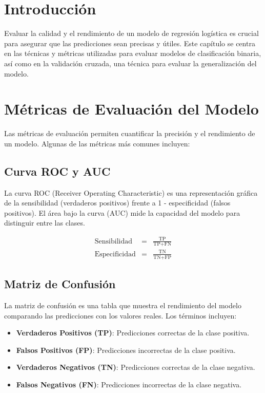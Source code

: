 

\section{Introducción}

Evaluar la calidad y el rendimiento de un modelo de regresión logística es crucial para asegurar que las predicciones sean precisas y útiles. Este capítulo se centra en las técnicas y métricas utilizadas para evaluar modelos de clasificación binaria, así como en la validación cruzada, una técnica para evaluar la generalización del modelo.

\section{Métricas de Evaluación del Modelo}

Las métricas de evaluación permiten cuantificar la precisión y el rendimiento de un modelo. Algunas de las métricas más comunes incluyen:

\subsection{Curva ROC y AUC}

La curva ROC (Receiver Operating Characteristic) es una representación gráfica de la sensibilidad (verdaderos positivos) frente a 1 - especificidad (falsos positivos). El área bajo la curva (AUC) mide la capacidad del modelo para distinguir entre las clases.

\begin{eqnarray*}
\text{Sensibilidad} &=& \frac{\text{TP}}{\text{TP} + \text{FN}} \\
\text{Especificidad} &=& \frac{\text{TN}}{\text{TN} + \text{FP}}
\end{eqnarray*}

\subsection{Matriz de Confusión}

La matriz de confusión es una tabla que muestra el rendimiento del modelo comparando las predicciones con los valores reales. Los términos incluyen:
\begin{itemize}
    \item \textbf{Verdaderos Positivos (TP)}: Predicciones correctas de la clase positiva.
    \item \textbf{Falsos Positivos (FP)}: Predicciones incorrectas de la clase positiva.
    \item \textbf{Verdaderos Negativos (TN)}: Predicciones correctas de la clase negativa.
    \item \textbf{Falsos Negativos (FN)}: Predicciones incorrectas de la clase negativa.
\end{itemize}

